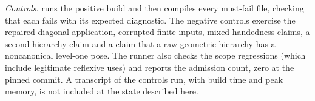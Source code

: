 \emph{Controls.}  runs the positive build and then compiles
every must-fail file, checking that each fails with its expected diagnostic. The negative
controls exercise the repaired diagonal application, corrupted finite inputs, mixed-handedness
claims, a second-hierarchy claim and a claim that a raw geometric hierarchy has a noncanonical
level-one pose. The
runner also checks the scope regressions (which include legitimate reflexive uses) and reports
the admission count, zero at the pinned commit. A transcript of the controls run, with build time
and peak memory, is not included at the state described here.
